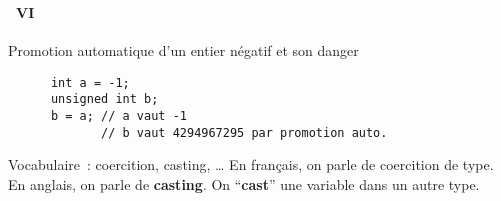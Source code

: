 \begin{frame}[containsverbatim]
  \frametitle{\secname}
  \framesubtitle{\subsecname~VI}

  \begin{exampleblock}{Promotion automatique d'un entier négatif et son danger}
    \begin{verbatim}
      int a = -1;
      unsigned int b;
      b = a; // a vaut -1
             // b vaut 4294967295 par promotion auto.
    \end{verbatim}
  \end{exampleblock}
  \begin{block}{Vocabulaire~: coercition, casting, \ldots}  
    En français, on parle de coercition de type. En anglais, on parle de \textbf{casting}. On ``\textbf{cast}'' une variable dans un autre type.
  \end{block}
\end{frame}

